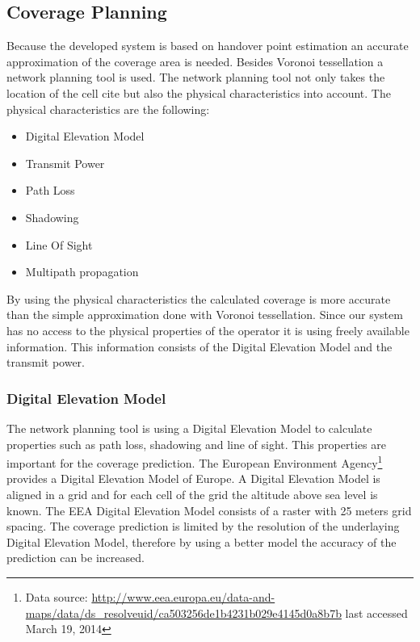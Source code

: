\subsection{Coverage Planning}
Because the developed system is based on handover point estimation an accurate approximation of the coverage area is needed. Besides Voronoi tessellation a network planning tool is used. The network planning tool not only takes the location of the cell cite but also the physical characteristics into account. The physical characteristics are the following:
\begin{itemize}
	\item Digital Elevation Model
	\item Transmit Power
	\item Path Loss
	\item Shadowing
	\item Line Of Sight
	\item Multipath propagation
\end{itemize} 
By using the physical characteristics the calculated coverage is more accurate than the simple approximation done with Voronoi tessellation. Since our system has no access to the physical properties of the operator it is using freely available information. This information consists of the Digital Elevation Model and the transmit power. 
\subsubsection{Digital Elevation Model}
The network planning tool is using a Digital Elevation Model to calculate properties such as path loss, shadowing and line of sight. This properties are important for the coverage prediction. The European Environment Agency\footnote{Data source: \url{http://www.eea.europa.eu/data-and-maps/data/ds_resolveuid/ca503256de1b4231b029e4145d0a8b7b} last accessed March 19, 2014} provides a Digital Elevation Model of Europe. A Digital Elevation Model is aligned in a grid and for each cell of the grid the altitude above sea level is known. The EEA Digital Elevation Model consists of a raster with 25 meters grid spacing. The coverage prediction is limited by the resolution of the underlaying Digital Elevation Model, therefore by using a better model the accuracy of the prediction can be increased. 
